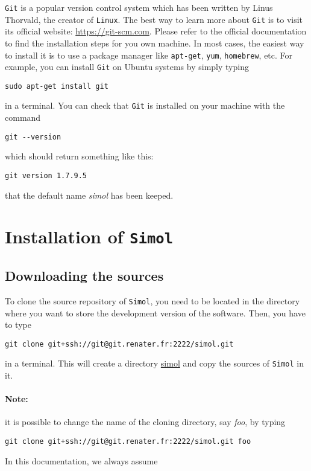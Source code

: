 \documentclass[12pt]{book}
\newcommand{\Git}{\texttt{Git}\xspace}
\newcommand{\Linux}{\texttt{Linux}\xspace}
\newcommand{\Simol}{\texttt{Simol}\xspace}
\newcommand{\urlGit}{\href{https://git-scm.com}{https://git-scm.com}}
\begin{document}
\Git is a popular version control system which has been written by Linus Thorvald, the creator of \Linux. The best way to learn more about \Git is to visit its official website: \urlGit. Please refer to the official documentation to find the installation steps for you own machine. In most cases, the easiest way to install it is to use a package manager like \texttt{apt-get}, \texttt{yum}, \texttt{homebrew}, etc. For example, you can install \Git on Ubuntu systems by simply typing
\lstset{language=bash} 
\begin{lstlisting}
sudo apt-get install git
\end{lstlisting}
in a terminal. You can check that \Git is installed on your machine with the command
\lstset{language=bash} 
\begin{lstlisting}
git --version
\end{lstlisting}
which should return something like this:
\begin{lstlisting}
git version 1.7.9.5
\end{lstlisting}





that the default name \textit{simol} has been keeped.

\section{Installation of \Simol}

\subsection{Downloading the sources}

To clone the source repository of \Simol, you need to be located in the directory where you want to store the development version of the software. Then, you have to type
\lstset{language=bash} 
\begin{lstlisting}
git clone git+ssh://git@git.renater.fr:2222/simol.git
\end{lstlisting}
in a terminal. This will create a directory \url{simol} and copy the sources of \Simol in it. 

\paragraph{Note:}
it is possible to change the name of the cloning directory, say \textit{foo}, by typing 
\lstset{language=bash} 
\begin{lstlisting}
git clone git+ssh://git@git.renater.fr:2222/simol.git foo
\end{lstlisting}
In this documentation, we always assume 
\end{document}
